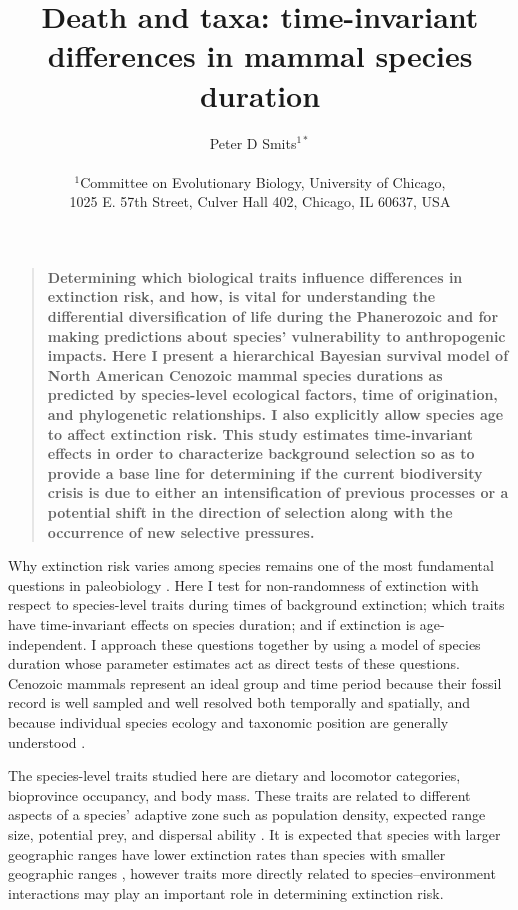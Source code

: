 \documentclass[12pt]{article}
\title{Death and taxa: time-invariant differences in mammal species duration}
\author
{Peter D Smits$^{1\ast}$\\
\\
\normalsize{$^{1}$Committee on Evolutionary Biology, University of Chicago,}\\
\normalsize{1025 E. 57th Street, Culver Hall 402, Chicago, IL 60637, USA}\\
}
\date{}
\newenvironment{sciabstract}{%
\begin{quote} \bf}
{\end{quote}}
\begin{document}
 


\baselineskip24pt


\maketitle 


\begin{sciabstract}
  Determining which biological traits influence differences in extinction risk, and how, is vital for understanding the differential diversification of life during the Phanerozoic and for making predictions about species' vulnerability to anthropogenic impacts. Here I present a hierarchical Bayesian survival model of North American Cenozoic mammal species durations as predicted by species-level ecological factors, time of origination, and phylogenetic relationships. I also explicitly allow species age to affect extinction risk. This study estimates time-invariant effects in order to characterize background selection so as to provide a base line for determining if the current biodiversity crisis is due to either an intensification of previous processes or a potential shift in the direction of selection along with the occurrence of new selective pressures.
\end{sciabstract}

Why extinction risk varies among species remains one of the most fundamental questions in paleobiology \cite{Simpson1944,VanValen1973,Raup1994,Quental2013,Wagner2014b}. Here I test for non-randomness of extinction with respect to species-level traits during times of background extinction; which traits have time-invariant effects on species duration; and if extinction is age-independent. I approach these questions together by using a model of species duration whose parameter estimates act as direct tests of these questions. Cenozoic mammals represent an ideal group and time period because their fossil record is well sampled and well resolved both temporally and spatially, and because individual species ecology and taxonomic position are generally understood \cite{Alroy2009,Liow2008,Smith2004,Quental2013,Simpson1944,Tomiya2013,Marcot2014}. 

The species-level traits studied here are dietary and locomotor categories, bioprovince occupancy, and body mass. These traits are related to different aspects of a species' adaptive zone such as population density, expected range size, potential prey, and dispersal ability \cite{Smith2004,Jernvall2004}. It is expected that species with larger geographic ranges have lower extinction rates than species with smaller geographic ranges \cite{Jablonski1986,Roy2009c}, however traits more directly related to species--environment interactions may play an important role in determining extinction risk. 
\end{document}

